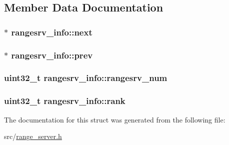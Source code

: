 \subsection{Member Data Documentation}
\hypertarget{structrangesrv__info_a7f87ab56d045e24e315b354075208b6d}{
\subsubsection[{next}]{$\ast$ rangesrv\-\_\-info\-::next}}\label{structrangesrv__info_a7f87ab56d045e24e315b354075208b6d}
\hypertarget{structrangesrv__info_af0a671859e5383bf4bab7f7a53b49b3b}{
\subsubsection[{prev}]{$\ast$ rangesrv\-\_\-info\-::prev}}\label{structrangesrv__info_af0a671859e5383bf4bab7f7a53b49b3b}
\hypertarget{structrangesrv__info_a90a6558f7f1922ae3394838255a937f3}{
\subsubsection[{rangesrv\-\_\-num}]{\setlength{\rightskip}{0pt plus 5cm}uint32\-\_\-t rangesrv\-\_\-info\-::rangesrv\-\_\-num}}\label{structrangesrv__info_a90a6558f7f1922ae3394838255a937f3}
\hypertarget{structrangesrv__info_af545372bc5a40a38b84408a208866960}{
\subsubsection[{rank}]{\setlength{\rightskip}{0pt plus 5cm}uint32\-\_\-t rangesrv\-\_\-info\-::rank}}\label{structrangesrv__info_af545372bc5a40a38b84408a208866960}


The documentation for this struct was generated from the following file\-:\begin{DoxyCompactItemize}
\item 
src/\hyperlink{range__server_8h}{range\-\_\-server.\-h}\end{DoxyCompactItemize}
